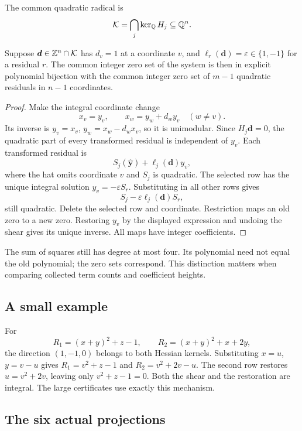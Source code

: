 \begin{definition}
The common quadratic radical is
\[
 \mathcal K=\bigcap_j\ker_{\mathbb Q}H_j\subseteq\mathbb Q^n.
\]
\end{definition}

\begin{theorem}\label{thm:radical}
Suppose $\boldsymbol d\in\mathbb Z^n\cap\mathcal K$ has $d_v=1$ at a
coordinate $v$, and $\ell_r(\boldsymbol d)=\varepsilon\in\{1,-1\}$
for a residual $r$. The common integer zero set of the system is then
in explicit polynomial bijection with the common integer zero set
of $m-1$ quadratic residuals in $n-1$ coordinates.
\end{theorem}
\begin{proof}
Make the integral coordinate change
\[
 x_v=y_v,\qquad x_w=y_w+d_wy_v\quad(w\ne v).
\]
Its inverse is $y_v=x_v$, $y_w=x_w-d_wx_v$, so it is unimodular.
Since $H_j\boldsymbol d=0$, the quadratic part of every transformed
residual is independent of $y_v$. Each transformed residual is
\[
 S_j(\widehat{\boldsymbol y})+\ell_j(\boldsymbol d)y_v,
\]
where the hat omits coordinate $v$ and $S_j$ is quadratic.
The selected row has the unique integral solution
$y_v=-\varepsilon S_r$. Substituting in all other rows gives
\[
 S_j-\varepsilon\ell_j(\boldsymbol d)S_r,
\]
still quadratic. Delete the selected row and coordinate.
Restriction maps an old zero to a new zero. Restoring $y_v$ by
the displayed expression and undoing the shear gives its unique
inverse. All maps have integer coefficients.
\end{proof}

The sum of squares still has degree at most four. Its polynomial need not equal the
old polynomial; the zero sets correspond. This distinction matters
when comparing collected term counts and coefficient heights.

\subsection{A small example}

For
\[
 R_1=(x+y)^2+z-1,\qquad R_2=(x+y)^2+x+2y,
\]
the direction $(1,-1,0)$ belongs to both Hessian kernels. Substituting
$x=u$, $y=v-u$ gives $R_1=v^2+z-1$ and $R_2=v^2+2v-u$.
The second row restores $u=v^2+2v$, leaving only $v^2+z-1=0$.
Both the shear and the restoration are integral. The large certificates
use exactly this mechanism.

\subsection{The six actual projections}

